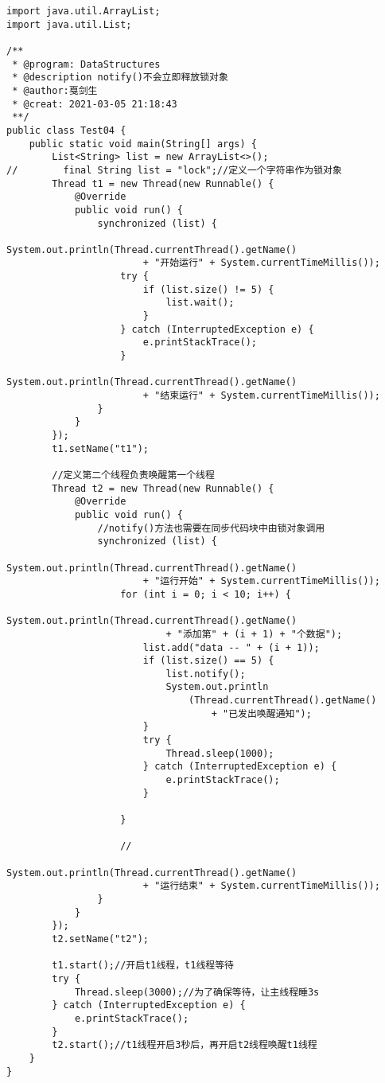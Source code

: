 \documentclass[a4paper]{report}
\begin{document}
\begin{Verbatim}[frame=single,numbersep=5pt,xleftmargin=1.5em,xrightmargin=1.5em]
import java.util.ArrayList;
import java.util.List;

/**
 * @program: DataStructures
 * @description notify()不会立即释放锁对象
 * @author:戛剑生
 * @creat: 2021-03-05 21:18:43
 **/
public class Test04 {
    public static void main(String[] args) {
        List<String> list = new ArrayList<>();
//        final String list = "lock";//定义一个字符串作为锁对象
        Thread t1 = new Thread(new Runnable() {
            @Override
            public void run() {
                synchronized (list) {
                    System.out.println(Thread.currentThread().getName()
                        + "开始运行" + System.currentTimeMillis());
                    try {
                        if (list.size() != 5) {
                            list.wait();
                        }
                    } catch (InterruptedException e) {
                        e.printStackTrace();
                    }
                    System.out.println(Thread.currentThread().getName()
                        + "结束运行" + System.currentTimeMillis());
                }
            }
        });
        t1.setName("t1");

        //定义第二个线程负责唤醒第一个线程
        Thread t2 = new Thread(new Runnable() {
            @Override
            public void run() {
                //notify()方法也需要在同步代码块中由锁对象调用
                synchronized (list) {
                    System.out.println(Thread.currentThread().getName()
                        + "运行开始" + System.currentTimeMillis());
                    for (int i = 0; i < 10; i++) {
                        System.out.println(Thread.currentThread().getName()
                            + "添加第" + (i + 1) + "个数据");
                        list.add("data -- " + (i + 1));
                        if (list.size() == 5) {
                            list.notify();
                            System.out.println
                                (Thread.currentThread().getName()
                                    + "已发出唤醒通知");
                        }
                        try {
                            Thread.sleep(1000);
                        } catch (InterruptedException e) {
                            e.printStackTrace();
                        }

                    }

                    //
                    System.out.println(Thread.currentThread().getName()
                        + "运行结束" + System.currentTimeMillis());
                }
            }
        });
        t2.setName("t2");

        t1.start();//开启t1线程，t1线程等待
        try {
            Thread.sleep(3000);//为了确保等待，让主线程睡3s
        } catch (InterruptedException e) {
            e.printStackTrace();
        }
        t2.start();//t1线程开启3秒后，再开启t2线程唤醒t1线程
    }
}
\end{Verbatim}
\end{document}
